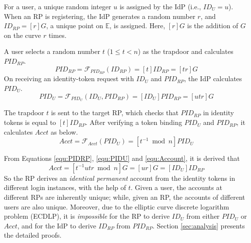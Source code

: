 For a user,
           a unique random integer $u$ is assigned by the IdP (i.e., $ID_U = u$).
When an RP is registering,
            the IdP generates a random number $r$, and $ID_{RP} = [r]G$, a unique point on $\mathbb{E}$, is assigned.
Here,
 $[r]G$ is the addition of $G$ on the curve $r$ times.

\vspace{0.5mm}
 A user selects a random number $t$ ($1 \leq t <n$) as the trapdoor
         and calculates $PID_{RP}$.
\begin{equation}
PID_{RP} = \mathcal{F}_{PID_{RP}}(ID_{RP}) = [t]{ID_{RP}} = [tr]G
\label{equ:PIDRP}
\end{equation}
On receiving an identity-token request with $ID_U$ and $PID_{RP}$,
    the IdP calculates $PID_{U}$.
\begin{equation}
PID_{U} = \mathcal{F}_{PID_U}(ID_U, PID_{RP}) =
  [{ID_U}]{PID_{RP}} = [utr]G
 \label{equ:PIDU}
\end{equation}


The trapdoor $t$ is sent to the target RP,
which checks that $PID_{RP}$ in identity tokens is equal to $[t]ID_{RP}$.
After verifying a token binding $PID_U$ and $PID_{RP}$,
    it calculates $Acct$ as below.
\begin{equation}
Acct = \mathcal{F}_{Acct}(PID_{U})
   = [t^{-1} \bmod n]PID_{U}
   \label{equ:Account}
\end{equation}

From Equations \ref{equ:PIDRP}, \ref{equ:PIDU} and \ref{equ:Account}, it is derived that
\begin{equation*}
   Acct =  [t^{-1}utr \bmod n]G = [ur]G = [ID_U]ID_{RP}
   \label{equ:AccountNotChanged}
\end{equation*}
So the RP derives an \emph{identical permanent} account from the identity tokens in different login instances,
    with the help of $t$. %
Given a user, the accounts at different RPs are inherently unique;
while, given an RP, the accounts of different users are also unique.
Moreover,
    due to the elliptic curve discrete logarithm problem (ECDLP),
it is \emph{impossible} for the RP to derive $ID_U$ from either $PID_U$ or $Acct$,
    and for the IdP to derive $ID_{RP}$ from $PID_{RP}$.
Section \ref{sec:analysis} presents the detailed proofs.


